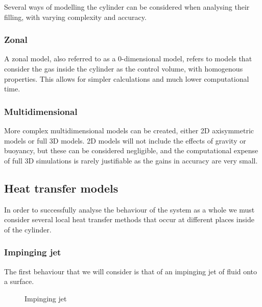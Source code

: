 Several ways of modelling the cylinder can be considered when analysing their filling, with varying complexity and accuracy.

\subsubsection{Zonal}

A zonal model, also referred to as a 0-dimensional model, refers to models that consider the gas inside the cylinder as the control volume, with homogenous properties. This allows for simpler calculations and much lower computational time.   

\subsubsection{Multidimensional}
\label{sec:multidimensional}

More complex multidimensional models can be created, either 2D axisymmetric models or full 3D models. 2D models will not include the effects of gravity or buoyancy, but these can be considered negligible, and the computational expense of full 3D simulations is rarely justifiable as the gains in accuracy are very small. 


\subsection{Heat transfer models}

In order to successfully analyse the behaviour of the system as a whole we must consider several local heat transfer methods that occur at different places inside of the cylinder.



\subsubsection{Impinging jet}

 The first behaviour that we will consider is that of an impinging jet of fluid onto a surface. 
 
 
 \begin{figure}[h]
\begin{centering}
\caption{Impinging jet}
\label{fig:inpinging_jet}
\end{centering}
\end{figure}


